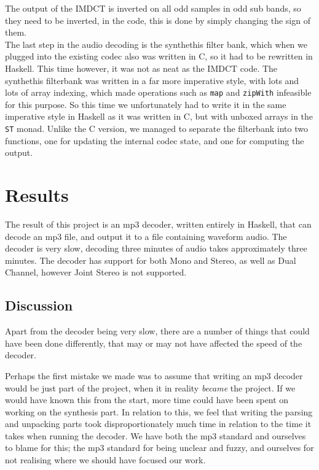 \documentclass[a4paper,12pt]{article}
\begin{document}
        The output of the IMDCT is inverted on all odd samples in odd sub bands,
        so they need to be inverted, in the code, this is done by simply
        changing the sign of them. \\

        The last step in the audio decoding is the synthethis filter bank, which
        when we plugged into the existing codec also was written in C, so it had
        to be rewritten in Haskell. This time however, it was not as neat as the
        IMDCT code. The synthethis filterbank was written in a far more
        imperative style, with lots and lots of array indexing, which made
        operations such as \texttt{map} and \texttt{zipWith} infeasible for this
        purpose. So this time we unfortunately had to write it in the same
        imperative style in Haskell as it was written in C, but with unboxed
        arrays in the \texttt{ST} monad.  Unlike the C version, we managed to
        separate the filterbank into two functions, one for updating the
        internal codec state, and one for computing the output.

\section{Results}
    The result of this project is an mp3 decoder, written entirely in Haskell,
    that can decode an mp3 file, and output it to a file containing waveform
    audio. The decoder is very slow, decoding three minutes of audio takes
    approximately three minutes. The decoder has support for both Mono and
    Stereo, as well as Dual Channel, however Joint Stereo is not supported.

    \subsection{Discussion}
        Apart from the decoder being very slow, there are a number of things
        that could have been done differently, that may or may not have affected
        the speed of the decoder.

        Perhaps the first mistake we made was to assume that writing an mp3
        decoder would be just part of the project, when it in reality
        \textit{became} the project. If we would have known this from the start,
        more time could have been spent on working on the synthesis part. In
        relation to this, we feel that writing the parsing and unpacking parts
        took disproportionately much time in relation to the time it takes when
        running the decoder. We have both the mp3 standard and ourselves to
        blame for this; the mp3 standard for being unclear and fuzzy, and
        ourselves for not realising where we should have focused our work.
\end{document}
